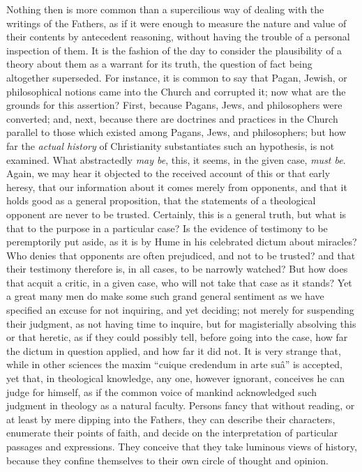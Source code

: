 Nothing then is more common than a supercilious
way of dealing with the writings of the Fathers, as if it were enough
to measure the nature and value of their contents by antecedent
reasoning, without having the trouble of a personal inspection of
them. It is the fashion of the day to consider the plausibility of a
theory about them as a warrant for its truth, the question of fact
being altogether superseded. For instance, it is common to say that
Pagan, Jewish, or philosophical notions came into the Church and
corrupted it; now what are the grounds for this assertion? First,
because Pagans, Jews, and philosophers were converted; and, next,
because there are doctrines and practices in the Church parallel to
those which existed among Pagans, Jews, and philosophers; but how far
the \emph{actual history} of Christianity substantiates such an
hypothesis, is not examined. What abstractedly \emph{may be}, this, it
seems, in the given case, \emph{must be}. Again, we may hear it
objected to the received account of this or that early heresy, that
our information about it comes merely from opponents, and that it
holds good as a general proposition, that the statements of a
theological opponent are never to be trusted. Certainly, this is
a general truth, but what is that to the purpose in a particular case?
Is the evidence of testimony to be peremptorily put aside, as it is by
Hume in his celebrated dictum about miracles? Who denies that
opponents are often prejudiced, and not to be trusted? and that their
testimony therefore is, in all cases, to be narrowly watched? But how
does that acquit a critic, in a given case, who will not take that
case as it stands? Yet a great many men do make some such grand
general sentiment as we have specified an excuse for not inquiring,
and yet deciding; not merely for suspending their judgment, as not
having time to inquire, but for magisterially absolving this or that
heretic, as if they could possibly tell, before going into the case,
how far the dictum in question applied, and how far it did not. It is
very strange that, while in other sciences the maxim ``cuique credendum
in arte suâ'' is accepted, yet that, in theological knowledge, any
one, however ignorant, conceives he can judge for himself, as if the
common voice of mankind acknowledged such judgment in theology as a
natural faculty. Persons fancy that without reading, or at least by
mere dipping into the Fathers, they can describe their characters,
enumerate their points of faith, and decide on the interpretation of
particular passages and expressions. They conceive that they take
luminous views of history, because they confine themselves to their
own circle of thought and opinion.

